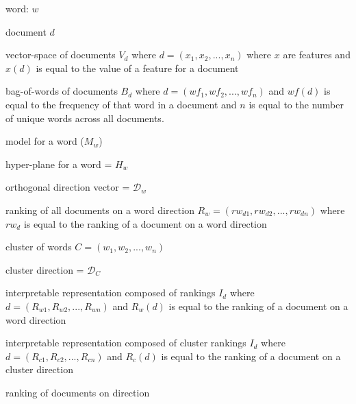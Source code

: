 


word: $w$

document $d$

vector-space of documents $V_d$ where $d = (x_1, x_2, ..., x_n)$ where $x$ are features and $x(d)$ is equal to the value of a feature for a document

bag-of-words of documents $B_d$ where $d = (wf_1, wf_2, ..., wf_n)$ and $wf(d)$ is equal to the frequency of that word in a document and $n$ is equal to the number of unique words across all documents.


model for a word ($M_w$)

hyper-plane for a word = $H_w$

orthogonal direction vector = $\mathcal{D}_w$

ranking of all documents on a word direction  $R_w = ({rw}_{d1}, {rw}_{d2}, ..., {rw}_{dn})$ where ${rw}_{d}$ is equal to the ranking of a document on a word direction

cluster of words $C = (w_1, w_2, ..., w_n)$

cluster direction = $\mathcal{D}_C$

interpretable representation composed of rankings $I_d$ where $d = (R_{w1}, R_{w2}, ..., R_{wn})$ and $R_w(d)$ is equal to the ranking of a document on a word direction

interpretable representation composed of cluster rankings $I_d$ where $d = (R_{c1}, R_{c2}, ..., R_{cn})$ and $R_c(d)$ is equal to the ranking of a document on a cluster direction

ranking of documents on direction
 

